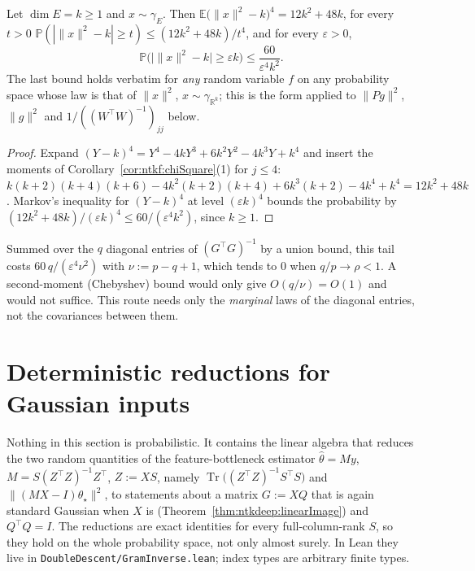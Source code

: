 \begin{theorem}\label{thm:dd:chiTail}
  \leanok
Let $\dim E=k\ge1$ and $x\sim\gamma_E$. Then $\mathbb E\bigl(\|x\|^2-k\bigr)^4=12k^2+48k$, for every $t>0$ $\mathbb P(|\|x\|^2-k|\ge t)\le(12k^2+48k)/t^4$, and for every $\varepsilon>0$,
\[
  \mathbb P\bigl(\bigl|\|x\|^2-k\bigr|\ge\varepsilon k\bigr)\le\frac{60}{\varepsilon^4k^2}.
\]
The last bound holds verbatim for \emph{any} random variable $f$ on any probability space whose law is that of $\|x\|^2$, $x\sim\gamma_{\mathbb R^k}$; this is the form applied to $\|Pg\|^2$, $\|g\|^2$ and $1/((W^\top W)^{-1})_{jj}$ below.
\end{theorem}

\begin{proof}
  \leanok
Expand $(Y-k)^4=Y^4-4kY^3+6k^2Y^2-4k^3Y+k^4$ and insert the moments of Corollary~\ref{cor:ntkf:chiSquare}(1) for $j\le4$:
$k(k+2)(k+4)(k+6)-4k^2(k+2)(k+4)+6k^3(k+2)-4k^4+k^4=12k^2+48k$. Markov's inequality for $(Y-k)^4$ at level $(\varepsilon k)^4$ bounds the
probability by $(12k^2+48k)/(\varepsilon k)^4\le60/(\varepsilon^4k^2)$, since $k\ge1$.
\end{proof}

\begin{remark}\label{rmk:dd:whyFourth}
Summed over the $q$ diagonal entries of $(G^\top G)^{-1}$ by a union bound, this tail costs $60\,q/(\varepsilon^4\nu^2)$ with $\nu:=p-q+1$,
which tends to $0$ when $q/p\to\rho<1$. A second-moment (Chebyshev) bound would only give $O(q/\nu)=O(1)$ and would not suffice. This route
needs only the \emph{marginal} laws of the diagonal entries, not the covariances between them.
\end{remark}


\section{Deterministic reductions for Gaussian inputs}\label{sec:dd:gram}

Nothing in this section is probabilistic. It contains the linear algebra that reduces the two random quantities of the feature-bottleneck estimator
$\hat\theta=My$, $M=S(Z^\top Z)^{-1}Z^\top$, $Z:=XS$, namely $\operatorname{Tr}\bigl((Z^\top Z)^{-1}S^\top S\bigr)$ and $\|(MX-I)\theta_\star\|^2$,
to statements about a matrix $G:=XQ$ that is again standard Gaussian when $X$ is (Theorem~\ref{thm:ntkdeep:linearImage}) and $Q^\top Q=I$. The
reductions are exact identities for every full-column-rank $S$, so they hold on the whole probability space, not only almost surely.
In Lean they live in \texttt{DoubleDescent/GramInverse.lean}; index types are arbitrary finite types.

